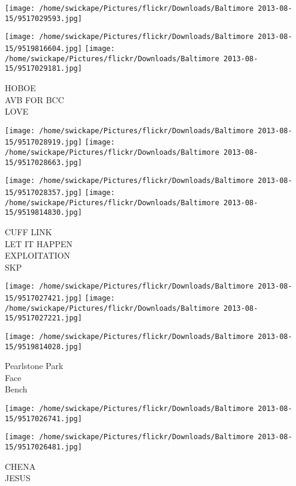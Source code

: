 \documentclass[10pt,letterpaper]{article}
\begin{document}
\texttt{[image: /home/swickape/Pictures/flickr/Downloads/Baltimore 2013-08-15/9517029593.jpg]}

\vspace{0.25in}
\texttt{[image: /home/swickape/Pictures/flickr/Downloads/Baltimore 2013-08-15/9519816604.jpg]}
\texttt{[image: /home/swickape/Pictures/flickr/Downloads/Baltimore 2013-08-15/9517029181.jpg]}

HOBOE\\
AVB FOR BCC\\
LOVE\\
\pagebreak

\texttt{[image: /home/swickape/Pictures/flickr/Downloads/Baltimore 2013-08-15/9517028919.jpg]}
\texttt{[image: /home/swickape/Pictures/flickr/Downloads/Baltimore 2013-08-15/9517028663.jpg]}

\texttt{[image: /home/swickape/Pictures/flickr/Downloads/Baltimore 2013-08-15/9517028357.jpg]}
\texttt{[image: /home/swickape/Pictures/flickr/Downloads/Baltimore 2013-08-15/9519814830.jpg]}

CUFF LINK\\
LET IT HAPPEN\\
EXPLOITATION\\
SKP\\
\pagebreak

\texttt{[image: /home/swickape/Pictures/flickr/Downloads/Baltimore 2013-08-15/9517027421.jpg]}
\texttt{[image: /home/swickape/Pictures/flickr/Downloads/Baltimore 2013-08-15/9517027221.jpg]}

\vspace{0.25in}
\texttt{[image: /home/swickape/Pictures/flickr/Downloads/Baltimore 2013-08-15/9519814028.jpg]}

Pearlstone Park\\
Face\\
Bench\\
\pagebreak

\texttt{[image: /home/swickape/Pictures/flickr/Downloads/Baltimore 2013-08-15/9517026741.jpg]}

\vspace{0.25in}
\texttt{[image: /home/swickape/Pictures/flickr/Downloads/Baltimore 2013-08-15/9517026481.jpg]}

CHENA\\
JESUS\\
\pagebreak
\end{document}
